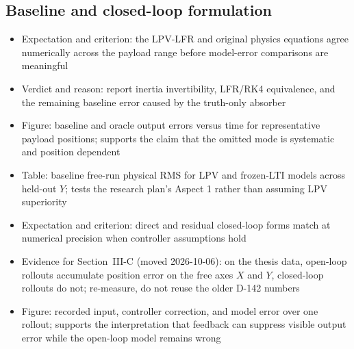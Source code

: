 \subsection{Baseline and closed-loop formulation}
\begin{itemize}
\item Expectation and criterion: the LPV-LFR and original physics equations agree numerically across the payload range before model-error comparisons are meaningful
\item Verdict and reason: report inertia invertibility, LFR/RK4 equivalence, and the remaining baseline error caused by the truth-only absorber
\item Figure: baseline and oracle output errors versus time for representative payload positions; supports the claim that the omitted mode is systematic and position dependent
\item Table: baseline free-run physical RMS for LPV and frozen-LTI models across held-out $Y$; tests the research plan's Aspect 1 rather than assuming LPV superiority
\item Expectation and criterion: direct and residual closed-loop forms match at numerical precision when controller assumptions hold
\item Evidence for Section~III-C (moved 2026-10-06): on the thesis data, open-loop rollouts accumulate position error on the free axes $X$ and $Y$, closed-loop rollouts do not; re-measure, do not reuse the older D-142 numbers
\item Figure: recorded input, controller correction, and model error over one rollout; supports the interpretation that feedback can suppress visible output error while the open-loop model remains wrong
\end{itemize}

